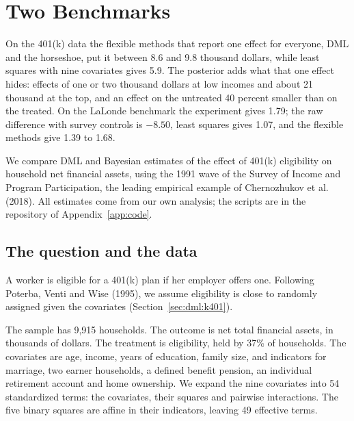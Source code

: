\chapter{Two Benchmarks}\label{ch:k401}

\begin{tcolorbox}[colback=gray!6,colframe=gray!50,title=In brief,fonttitle=\normalfont\itshape,coltitle=black,colbacktitle=gray!15,boxrule=0.4pt,arc=1pt]
On the 401(k) data the flexible methods that report one effect for everyone, DML and the horseshoe, put it between 8.6 and 9.8 thousand dollars, while least squares with nine covariates gives 5.9. The posterior adds what that one effect hides: effects of one or two thousand dollars at low incomes and about 21 thousand at the top, and an effect on the untreated 40 percent smaller than on the treated. On the LaLonde benchmark the experiment gives 1.79; the raw difference with survey controls is $-8.50$, least squares gives 1.07, and the flexible methods give 1.39 to 1.68.
\end{tcolorbox}

We compare DML and Bayesian estimates of the effect of 401(k) eligibility on household net financial assets, using the 1991 wave of the Survey of Income and Program Participation, the leading empirical example of Chernozhukov et al. (2018). All estimates come from our own analysis; the scripts are in the repository of Appendix~\ref{app:code}.

\section{The question and the data}

A worker is eligible for a 401(k) plan if her employer offers one. Following Poterba, Venti and Wise (1995), we assume eligibility is close to randomly assigned given the covariates (Section~\ref{sec:dml:k401}).

The sample has 9,915 households. The outcome is net total financial assets, in thousands of dollars. The treatment is eligibility, held by 37\% of households. The covariates are age, income, years of education, family size, and indicators for marriage, two earner households, a defined benefit pension, an individual retirement account and home ownership. We expand the nine covariates into 54 standardized terms: the covariates, their squares and pairwise interactions. The five binary squares are affine in their indicators, leaving 49 effective terms.

